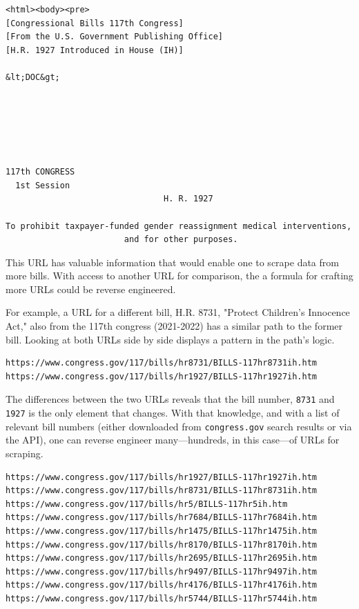 \documentclass[11pt]{article}
\begin{document}
\begin{enumerate}
\begin{verbatim}
<html><body><pre>
[Congressional Bills 117th Congress]
[From the U.S. Government Publishing Office]
[H.R. 1927 Introduced in House (IH)]

&lt;DOC&gt;






117th CONGRESS
  1st Session
                                H. R. 1927

To prohibit taxpayer-funded gender reassignment medical interventions, 
                        and for other purposes.
\end{verbatim}

This URL has valuable information that would enable one to scrape data
from more bills. With access to another URL for comparison, the a
formula for crafting more URLs could be reverse engineered.

For example, a URL for a different bill, H.R. 8731, "Protect
Children's Innocence Act," also from the 117th congress (2021-2022)
has a similar path to the former bill. Looking at both URLs side by
side displays a pattern in the path's logic.

\begin{verbatim}
https://www.congress.gov/117/bills/hr8731/BILLS-117hr8731ih.htm
https://www.congress.gov/117/bills/hr1927/BILLS-117hr1927ih.htm  
\end{verbatim}

The differences between the two URLs reveals that the bill number,
\texttt{8731} and \texttt{1927} is the only element that changes. With that
knowledge, and with a list of relevant bill numbers (either downloaded
from \texttt{congress.gov} search results or via the API), one can reverse
engineer many---hundreds, in this case---of URLs for scraping. 

\begin{verbatim}
https://www.congress.gov/117/bills/hr1927/BILLS-117hr1927ih.htm
https://www.congress.gov/117/bills/hr8731/BILLS-117hr8731ih.htm
https://www.congress.gov/117/bills/hr5/BILLS-117hr5ih.htm
https://www.congress.gov/117/bills/hr7684/BILLS-117hr7684ih.htm
https://www.congress.gov/117/bills/hr1475/BILLS-117hr1475ih.htm
https://www.congress.gov/117/bills/hr8170/BILLS-117hr8170ih.htm
https://www.congress.gov/117/bills/hr2695/BILLS-117hr2695ih.htm
https://www.congress.gov/117/bills/hr9497/BILLS-117hr9497ih.htm
https://www.congress.gov/117/bills/hr4176/BILLS-117hr4176ih.htm
https://www.congress.gov/117/bills/hr5744/BILLS-117hr5744ih.htm
\end{verbatim}


\end{enumerate}
\end{document}
